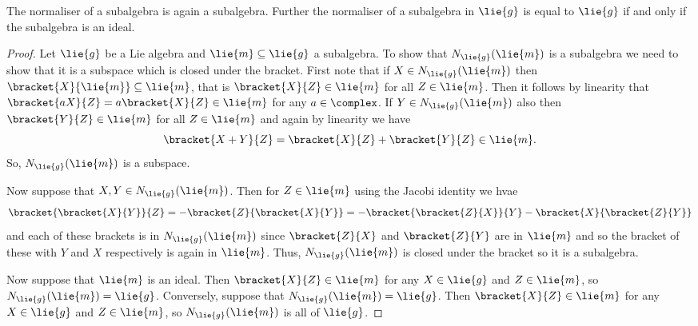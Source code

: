 \documentclass[fleqn]{NotesClass}
\begin{document}
    \begin{lma}{}{}
        The normaliser of a subalgebra is again a subalgebra.
        Further the normaliser of a subalgebra in \(\lie{g}\) is equal to \(\lie{g}\) if and only if the subalgebra is an ideal.
        \begin{proof}
            Let \(\lie{g}\) be a Lie algebra and \(\lie{m} \subseteq \lie{g}\) a subalgebra.
            To show that \(N_{\lie{g}}(\lie{m})\) is a subalgebra we need to show that it is a subspace which is closed under the bracket.
            First note that if \(X \in N_{\lie{g}}(\lie{m})\) then \(\bracket{X}{\lie{m}} \subseteq \lie{m}\), that is \(\bracket{X}{Z} \in \lie{m}\) for all \(Z \in \lie{m}\).
            Then it follows by linearity that \(\bracket{aX}{Z} = a\bracket{X}{Z} \in \lie{m}\) for any \(a \in \complex\).
            If \(Y \in N_{\lie{g}}(\lie{m})\) also then \(\bracket{Y}{Z} \in \lie{m}\) for all \(Z \in \lie{m}\) and again by linearity we have
            \begin{equation}
                \bracket{X + Y}{Z} = \bracket{X}{Z} + \bracket{Y}{Z} \in \lie{m}.
            \end{equation}
            So, \(N_{\lie{g}}(\lie{m})\) is a subspace.
            
            Now suppose that \(X, Y \in N_{\lie{g}}(\lie{m})\).
            Then for \(Z \in \lie{m}\) using the Jacobi identity we hvae
            \begin{equation}
                \bracket{\bracket{X}{Y}}{Z} = -\bracket{Z}{\bracket{X}{Y}} = -\bracket{\bracket{Z}{X}}{Y} - \bracket{X}{\bracket{Z}{Y}}
            \end{equation}
            and each of these brackets is in \(N_{\lie{g}}(\lie{m})\) since \(\bracket{Z}{X}\) and \(\bracket{Z}{Y}\) are in \(\lie{m}\) and so the bracket of these with \(Y\) and \(X\) respectively is again in \(\lie{m}\).
            Thus, \(N_{\lie{g}}(\lie{m})\) is closed under the bracket so it is a subalgebra.
            
            Now suppose that \(\lie{m}\) is an ideal.
            Then \(\bracket{X}{Z} \in \lie{m}\) for any \(X \in \lie{g}\) and \(Z \in \lie{m}\), so \(N_{\lie{g}}(\lie{m}) = \lie{g}\).
            Conversely, suppose that \(N_{\lie{g}}(\lie{m}) = \lie{g}\).
            Then \(\bracket{X}{Z} \in \lie{m}\) for any \(X \in \lie{g}\) and \(Z \in \lie{m}\), so \(N_{\lie{g}}(\lie{m})\) is all of \(\lie{g}\).
        \end{proof}
    \end{lma}
    
\end{document}
